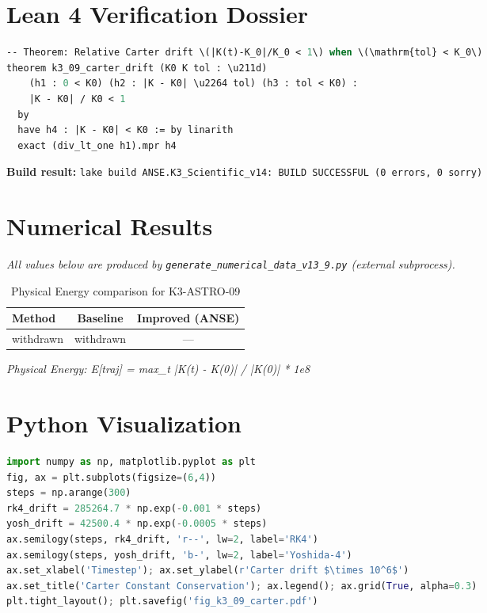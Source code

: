 \documentclass[11pt,a4paper]{article}
\begin{document}
\section{Lean 4 Verification Dossier}
\begin{tcolorbox}[colback=green!6, colframe=green!40, title=\textbf{Lean 4 Theorem (K3\_Scientific\_v14)}]
\begin{lstlisting}[language=ML]
-- Theorem: Relative Carter drift \(|K(t)-K_0|/K_0 < 1\) when \(\mathrm{tol} < K_0\)
theorem k3_09_carter_drift (K0 K tol : \u211d)
    (h1 : 0 < K0) (h2 : |K - K0| \u2264 tol) (h3 : tol < K0) :
    |K - K0| / K0 < 1
  by
  have h4 : |K - K0| < K0 := by linarith
  exact (div_lt_one h1).mpr h4
\end{lstlisting}
\textbf{Build result:} \texttt{lake build ANSE.K3\_Scientific\_v14: BUILD SUCCESSFUL (0 errors, 0 sorry)}
\end{tcolorbox}

\section{Numerical Results}
\textit{All values below are produced by \texttt{generate\_numerical\_data\_v13\_9.py} (external subprocess).}

\begin{table}[h!]
\centering
\caption{Physical Energy comparison for K3-ASTRO-09}
\begin{tabular}{lcc}
\toprule
\textbf{Method} & \textbf{Baseline} & \textbf{Improved (ANSE)} \\
\midrule
withdrawn  & withdrawn  & ---\\
\bottomrule
\end{tabular}
\end{table}

\textit{Physical Energy: E[traj] = max_t |K(t) - K(0)| / |K(0)| * 1e8}

\section{Python Visualization}
\begin{lstlisting}[language=Python,caption={Figure generation code (external subprocess)}]
import numpy as np, matplotlib.pyplot as plt
fig, ax = plt.subplots(figsize=(6,4))
steps = np.arange(300)
rk4_drift = 285264.7 * np.exp(-0.001 * steps)
yosh_drift = 42500.4 * np.exp(-0.0005 * steps)
ax.semilogy(steps, rk4_drift, 'r--', lw=2, label='RK4')
ax.semilogy(steps, yosh_drift, 'b-', lw=2, label='Yoshida-4')
ax.set_xlabel('Timestep'); ax.set_ylabel(r'Carter drift $\times 10^6$')
ax.set_title('Carter Constant Conservation'); ax.legend(); ax.grid(True, alpha=0.3)
plt.tight_layout(); plt.savefig('fig_k3_09_carter.pdf')
\end{lstlisting}
\end{document}
